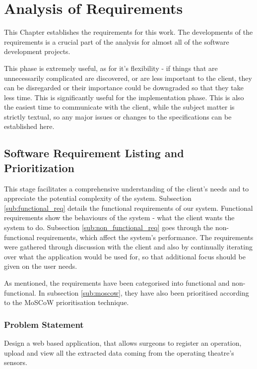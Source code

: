 \chapter{Analysis of Requirements}
\label{chapterlabel3}


This Chapter establishes the requirements for this work. The developments of the requirements is a crucial part of the analysis for almost all of the software development projects.

This phase is extremely useful, as for it's flexibility - if things that are unnecessarily complicated are discovered, or are less important to the client, they can be disregarded  or their importance could be downgraded so that they take less time. This is significantly useful for the implementation phase. This is also the easiest time to communicate with the client, while the subject matter is strictly textual, so any major issues or changes to the specifications can be established here.


\section{Software Requirement Listing and Prioritization}
\label{sec:softreqlistandprior} 

This stage facilitates a comprehensive understanding of the client's needs and to appreciate the potential complexity of the system. Subsection \ref{sub:functional_req} details the functional requirements of our system.  Functional requirements show the behaviours of the system - what the client wants the system to do.  Subsection \ref{sub:non_functional_req} goes through the non-functional requirements, which affect the system's performance. 
The requirements were gathered through discussion with the client and also by continually iterating over what the application would be used for, so that additional focus should be given on the user needs.


 As mentioned, the requirements have been categorised into functional and non-functional. In subsection \ref{sub:moscow}, they have also been prioritised according to the MoSCoW prioritisation technique\cite{cleggbarker1994}.

\subsection{Problem Statement}
\label{sub:problem_st}

Design a web based application, that allows surgeons to register an operation, upload and view all the extracted data coming from the operating theatre's sensors.


